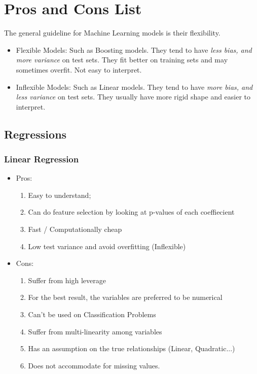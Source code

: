 \documentclass[12pt]{amsart}
\numberwithin{equation}{section}
\theoremstyle{plain}
\theoremstyle{definition}
\begin{document}
\section{Pros and Cons List}
The general guideline for Machine Learning models is their flexibility.
\begin{itemize}
\item Flexible Models: Such as Boosting models. They tend to have {\em less bias, and more variance} on test sets. They fit better on training sets and may sometimes overfit. Not easy to interpret.
\item Inflexible Models: Such as Linear models. They tend to have {\em more bias, and less variance} on test sets. They usually have more rigid shape and easier to interpret. 
\end{itemize}

\subsection{Regressions}
\subsubsection{Linear Regression}

\begin{itemize}
\item Pros: 

\begin{enumerate}
\item Easy to understand;
\item Can do feature selection by looking at p-values of each coeffiecient
\item Fast / Computationally cheap
\item Low test variance and avoid overfitting (Inflexible)
\end{enumerate}

\item Cons:

\begin{enumerate}
\item Suffer from high leverage
\item For the best result, the variables are preferred to be numerical
\item Can't be used on Classification Problems
\item Suffer from multi-linearity among variables
\item Has an assumption on the true relationships (Linear, Quadratic...)
\item Does not accommodate for missing values.
\end{enumerate}

\end{itemize}
\end{document}
